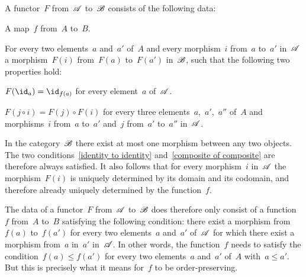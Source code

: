 \subsection{}

A functor~$F$ from~$\mathscr{A}$ to~$\mathscr{B}$ consists of the following data:
\begin{itemize*}
	\item
		A map~$f$ from~$A$ to~$B$.
	\item
		For every two elements~$a$ and~$a'$ of~$A$ and every morphism~$i$ from~$a$ to~$a'$ in~$\mathscr{A}$ a morphism~$F(i)$ from~$F(a)$ to~$F(a')$ in~$\mathscr{B}$, such that the following two properties hold:
		\begin{enumerate*}
			\item
				\label{identity to identity}
				$F(\id_a) = \id_{f(a)}$ for every element~$a$ of~$\mathscr{A}$.
			\item
				\label{composite of composite}
				$F(j ∘ i) = F(j) ∘ F(i)$ for every three elements~$a$,~$a'$,~$a''$ of~$A$ and morphisms~$i$ from~$a$ to~$a'$ and~$j$ from~$a'$ to~$a''$ in~$\mathscr{A}$.
		\end{enumerate*}
\end{itemize*}

In the category~$\mathscr{B}$ there exist at most one morphism between any two objects.
The two conditions~\ref{identity to identity} and~\ref{composite of composite} are therefore always satisfied.
It also follows that for every morphism~$i$ in~$\mathscr{A}$ the morphism~$F(i)$ is uniquely determined by its domain and its codomain, and therefore already uniquely determined by the function~$f$.

The data of a functor~$F$ from~$\mathscr{A}$ to~$\mathscr{B}$ does therefore only consist of a function~$f$ from~$A$ to~$B$ satisfying the following condition:
there exist a morphism from~$f(a)$ to~$f(a')$ for every two elements~$a$ and~$a'$ of~$\mathscr{A}$ for which there exist a morphism from~$a$ in~$a'$ in~$\mathscr{A}$.
In other words, the function~$f$ needs to satisfy the condition~$f(a) ≤ f(a')$ for every two elements~$a$ and~$a'$ of~$A$ with~$a ≤ a'$.
But this is precisely what it means for~$f$ to be order-preserving.
